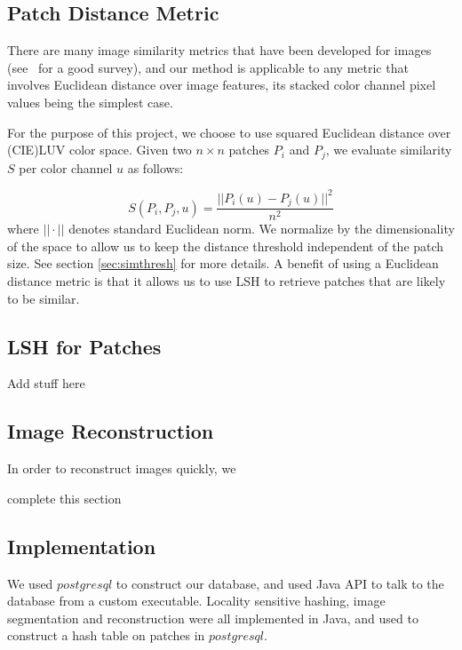\subsection{Patch Distance Metric}\label{sec:sim}
There are many image similarity metrics that have been developed for
images (see~\cite{yasmin2013use} for a good survey), and
our method is applicable to any metric that involves Euclidean
distance over image features, its stacked color channel pixel values
being the simplest case.

For the purpose of this project, we choose to use squared Euclidean
distance over (CIE)LUV color space.
Given two $n \times n$ patches $P_i$ and $P_j$, we evaluate similarity $S$
per color channel $u$ as follows:

\begin{displaymath}
S(P_i, P_j, u) = \frac{||P_i(u) - P_j(u)||^2}{n^2}
\end{displaymath}
where $||\cdot||$ denotes standard Euclidean norm.
We normalize by the dimensionality of the space to allow us to keep the
distance threshold independent of the patch size. See section \ref{sec:simthresh} for more details.  A benefit of using a Euclidean distance metric is that it allows us to use LSH to retrieve patches that are likely to be similar.

\subsection{LSH for Patches}\label{sec:lsh}
\begin{edit}
Add stuff here
\end{edit}

\subsection{Image Reconstruction}\label{sec:reconst}

In order to reconstruct images quickly, we
\begin{edit}
complete this section
\end{edit}

\subsection{Implementation}\label{sec:impl}
We used $postgresql$ to construct our database, and used
Java API to talk to the database from a custom executable. Locality
sensitive hashing, image segmentation and reconstruction were
all implemented in Java, and used to construct a hash table
on patches in $postgresql$.

